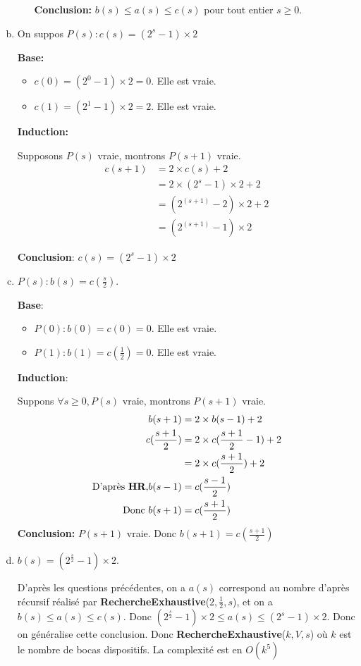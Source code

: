 \documentclass{article}
\begin{document}
\begin{enumerate}[a)]
\begin{enumerate}[i. ]
\textbf{Conclusion: }$b(s) \leq a(s) \leq c(s)$ pour tout entier $s\geq0$.
\end{enumerate}
\item On suppos $P(s): c(s)=(2^s-1) \times 2$

\textbf{Base: } 
\begin{itemize}
\item $c(0)=(2^0-1) \times 2 = 0$. Elle est vraie.
\item $c(1)=(2^1-1) \times 2 = 2$. Elle est vraie.
\end{itemize}
\textbf{Induction: } 

Supposons $P(s)$ vraie, montrons $P(s+1)$ vraie.
\begin{align*}
c(s+1) &= 2 \times c(s)+ 2 
			\\&= 2 \times (2^s - 1) \times 2 + 2
			\\&=(2^(s+1) - 2) \times 2 + 2\\&=(2^(s+1)-1) \times 2
\end{align*}

\textbf{Conclusion}: $c(s)=(2^s-1) \times 2$
\item $P(s): b(s)=c(\frac{s}{2})$. 

\textbf{Base}: 
\begin{itemize}
\item $P(0): b(0)=c(0)=0$. Elle est vraie.
\item $P(1): b(1)=c(\frac{1}{2})=0$. Elle est vraie.
\end{itemize}
\textbf{Induction}: 

Suppons $\forall s \geq 0, P(s)$ vraie, montrons $P(s+1)$ vraie.
\begin{align*}
b(s+1) &= 2 \times b(s-1) + 2\\
c(\frac{s+1}{2}) &= 2 \times c(\frac{s+1}{2} - 1) + 2\\&=2 \times c(\frac{s+1}{2}) +2\\\text{D'après \textbf {HR},} b(s-1)&=c(\frac{s-1}{2})\\
\text{Donc }b(s+1) &=c(\frac{s+1}{2})
\end{align*}
\textbf{Conclusion: }$P(s+1)$ vraie. Donc $b(s+1) = c(\frac{s+1}{2})$
\item $b(s) =(2^{\frac{s}{2}}-1) \times 2.$

D'après les questions précédentes, on a $a(s)$ correspond au nombre d'après récursif réalisé par \textbf{RechercheExhaustive}($2,\frac12,s$), et on a $b(s) \leq a(s) \leq c(s)$. Donc $(2^{\frac{s}{2}}-1) \times 2 \leq a(s) \leq (2^s-1) \times 2$. Donc on généralise cette conclusion. Donc \textbf{RechercheExhaustive}($k, V, s$) où $k$ est le nombre de bocas dispositifs. La complexité est en $O(k^5)$
\end{enumerate}
\end{document}
